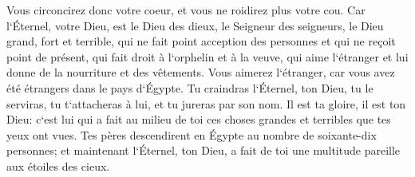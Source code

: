 \verse Vous circoncirez donc votre coeur, et vous ne roidirez plus votre cou. 
\verse Car l`Éternel, votre Dieu, est le Dieu des dieux, le Seigneur des seigneurs, le Dieu grand, fort et terrible, qui ne fait point acception des personnes et qui ne reçoit point de présent, 
\verse qui fait droit à l`orphelin et à la veuve, qui aime l`étranger et lui donne de la nourriture et des vêtements. 
\verse Vous aimerez l`étranger, car vous avez été étrangers dans le pays d`Égypte. 
\verse Tu craindras l`Éternel, ton Dieu, tu le serviras, tu t`attacheras à lui, et tu jureras par son nom. 
\verse Il est ta gloire, il est ton Dieu: c`est lui qui a fait au milieu de toi ces choses grandes et terribles que tes yeux ont vues. 
\verse Tes pères descendirent en Égypte au nombre de soixante-dix personnes; et maintenant l`Éternel, ton Dieu, a fait de toi une multitude pareille aux étoiles des cieux. 

\chapter{}

